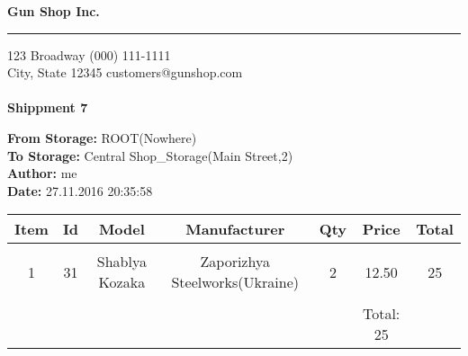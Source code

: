 \documentclass{article}
\begin{document}
\hfil{\Huge\bf Gun Shop Inc.}\hfil
\bigskip
\hrule
\bigskip

123 Broadway \hfill (000) 111-1111 \\
City, State 12345 \hfill customers@gunshop.com\\ \\

\hfill{\bf Shippment 7}\hfill
\bigskip

{\bf From Storage:}   ROOT(Nowhere)\\
{\bf To Storage:}  Central Shop\_Storage(Main Street,2) \\
{\bf Author:}  me \\ 
{\bf Date:}  27.11.2016 20:35:58 \\
\begin{center}
\begin{tabular}{ c c c c c c c }
  Item & Id & Model & Manufacturer & Qty & Price & Total  \\[2ex]
\hline\\
 1 & 31 & Shablya Kozaka& Zaporizhya Steelworks(Ukraine)& 2 & 12.50 & 25 \\ [2ex]\hline\\&&&&&Total: 25&\end{tabular}\end{center}
\end{document}
